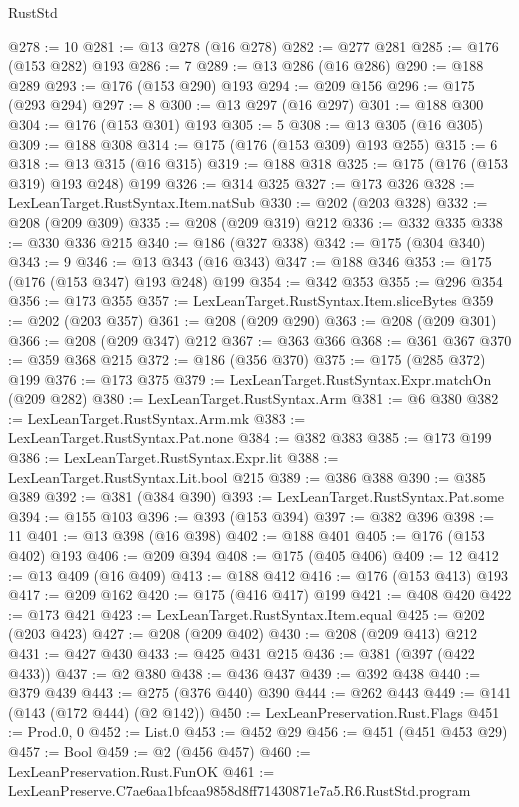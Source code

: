 \begin{lexlean}{RustStd}
\begin{coremodule}
@278 := 10
@281 := @13 @278 (@16 @278)
@282 := @277 @281
@285 := @176 (@153 @282) @193
@286 := 7
@289 := @13 @286 (@16 @286)
@290 := @188 @289
@293 := @176 (@153 @290) @193
@294 := @209 @156
@296 := @175 (@293 @294)
@297 := 8
@300 := @13 @297 (@16 @297)
@301 := @188 @300
@304 := @176 (@153 @301) @193
@305 := 5
@308 := @13 @305 (@16 @305)
@309 := @188 @308
@314 := @175 (@176 (@153 @309) @193 @255)
@315 := 6
@318 := @13 @315 (@16 @315)
@319 := @188 @318
@325 := @175 (@176 (@153 @319) @193 @248) @199
@326 := @314 @325
@327 := @173 @326
@328 := LexLeanTarget.RustSyntax.Item.natSub
@330 := @202 (@203 @328)
@332 := @208 (@209 @309)
@335 := @208 (@209 @319) @212
@336 := @332 @335
@338 := @330 @336 @215
@340 := @186 (@327 @338)
@342 := @175 (@304 @340)
@343 := 9
@346 := @13 @343 (@16 @343)
@347 := @188 @346
@353 := @175 (@176 (@153 @347) @193 @248) @199
@354 := @342 @353
@355 := @296 @354
@356 := @173 @355
@357 := LexLeanTarget.RustSyntax.Item.sliceBytes
@359 := @202 (@203 @357)
@361 := @208 (@209 @290)
@363 := @208 (@209 @301)
@366 := @208 (@209 @347) @212
@367 := @363 @366
@368 := @361 @367
@370 := @359 @368 @215
@372 := @186 (@356 @370)
@375 := @175 (@285 @372) @199
@376 := @173 @375
@379 := LexLeanTarget.RustSyntax.Expr.matchOn (@209 @282)
@380 := LexLeanTarget.RustSyntax.Arm
@381 := @6 @380
@382 := LexLeanTarget.RustSyntax.Arm.mk
@383 := LexLeanTarget.RustSyntax.Pat.none
@384 := @382 @383
@385 := @173 @199
@386 := LexLeanTarget.RustSyntax.Expr.lit
@388 := LexLeanTarget.RustSyntax.Lit.bool @215
@389 := @386 @388
@390 := @385 @389
@392 := @381 (@384 @390)
@393 := LexLeanTarget.RustSyntax.Pat.some
@394 := @155 @103
@396 := @393 (@153 @394)
@397 := @382 @396
@398 := 11
@401 := @13 @398 (@16 @398)
@402 := @188 @401
@405 := @176 (@153 @402) @193
@406 := @209 @394
@408 := @175 (@405 @406)
@409 := 12
@412 := @13 @409 (@16 @409)
@413 := @188 @412
@416 := @176 (@153 @413) @193
@417 := @209 @162
@420 := @175 (@416 @417) @199
@421 := @408 @420
@422 := @173 @421
@423 := LexLeanTarget.RustSyntax.Item.equal
@425 := @202 (@203 @423)
@427 := @208 (@209 @402)
@430 := @208 (@209 @413) @212
@431 := @427 @430
@433 := @425 @431 @215
@436 := @381 (@397 (@422 @433))
@437 := @2 @380
@438 := @436 @437
@439 := @392 @438
@440 := @379 @439
@443 := @275 (@376 @440) @390
@444 := @262 @443
@449 := @141 (@143 (@172 @444) (@2 @142))
@450 := LexLeanPreservation.Rust.Flags
@451 := Prod.{0, 0}
@452 := List.{0}
@453 := @452 @29
@456 := @451 (@451 @453 @29)
@457 := Bool
@459 := @2 (@456 @457)
@460 := LexLeanPreservation.Rust.FunOK
@461 := LexLeanPreserve.C7ae6aa1bfcaa9858d8ff71430871e7a5.R6.RustStd.program

\end{coremodule}
\end{lexlean}
